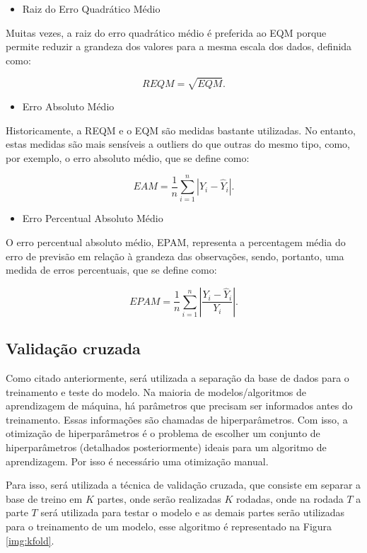 \documentclass[
	12pt,				%
	a4paper,		%
	oneside,    %
	chapter=TITLE,		   %
	section=TITLE,		   %
	subsection=TITLE,	   %
	subsubsection=TITLE, %
	english,			%
	french,				%
	spanish,			%
	brazil,				%
]{abntex2}
\providecommand{\tightlist}{%
	\setlength{\itemsep}{0pt}\setlength{\parskip}{0pt}}
\begin{document}
\begin{itemize}
\tightlist
\item
  Raiz do Erro Quadrático Médio
\end{itemize}

Muitas vezes, a raiz do erro quadrático médio é preferida ao EQM porque
permite reduzir a grandeza dos valores para a mesma escala dos dados,
definida como:

\[REQM = \sqrt{EQM}.\]

\begin{itemize}
\tightlist
\item
  Erro Absoluto Médio
\end{itemize}

Historicamente, a REQM e o EQM são medidas bastante utilizadas. No
entanto, estas medidas são mais sensíveis a outliers do que outras do
mesmo tipo, como, por exemplo, o erro absoluto médio, que se define
como:

\[EAM = \frac{1}{n} \sum_{i=1}^n |Y_i - \hat{Y}_i|.\]

\begin{itemize}
\tightlist
\item
  Erro Percentual Absoluto Médio
\end{itemize}

O erro percentual absoluto médio, EPAM, representa a percentagem média
do erro de previsão em relação à grandeza das observações, sendo,
portanto, uma medida de erros percentuais, que se define como:

\[EPAM =  \frac{1}{n} \sum_{i=1}^n \left| \frac{Y_i - \hat{Y}_i}{Y_i} \right|.\]

\hypertarget{validauxe7uxe3o-cruzada}{%
\subsection{Validação cruzada}\label{validauxe7uxe3o-cruzada}}

Como citado anteriormente, será utilizada a separação da base de dados
para o treinamento e teste do modelo. Na maioria de modelos/algoritmos
de aprendizagem de máquina, há parâmetros que precisam ser informados
antes do treinamento. Essas informações são chamadas de hiperparâmetros.
Com isso, a otimização de hiperparâmetros é o problema de escolher um
conjunto de hiperparâmetros (detalhados posteriormente) ideais para um
algoritmo de aprendizagem. Por isso é necessário uma otimização manual.

Para isso, será utilizada a técnica de validação cruzada, que consiste
em separar a base de treino em \(K\) partes, onde serão realizadas \(K\)
rodadas, onde na rodada \(T\) a parte \(T\) será utilizada para testar o
modelo e as demais partes serão utilizadas para o treinamento de um
modelo, esse algoritmo é representado na Figura \ref{img:kfold}.
\end{document}
